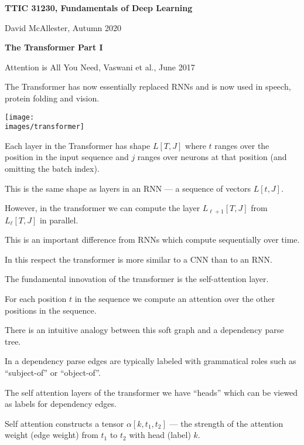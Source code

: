 





{\Huge
  \centerline{\bf TTIC 31230,  Fundamentals of Deep Learning}
  \vfill
  \centerline{David McAllester, Autumn 2020}
  \vfill
  \centerline{\bf  The Transformer Part I}
  \vfill
  \vfill


Attention is All You Need, Vaswani et al., June 2017

\vfill
The Transformer has now essentially replaced RNNs and is now used in speech, protein folding and vision.

\centerline{\texttt{[image: \\images/transformer]}}

\vfill
Each layer in the Transformer has shape $L[T,J]$ where $t$ ranges over the position in the input sequence and $j$ ranges over neurons at that position
(and omitting the batch index).

\vfill
This is the same shape as layers in an RNN --- a sequence of vectors $L[t,J]$.


However, in the transformer we can compute the layer $L_{\ell+1}[T,J]$ from $L_\ell[T,J]$ in parallel.

\vfill
This is an important difference from RNNs which compute sequentially over time.

\vfill
In this respect the transformer is more similar to a CNN than to an RNN.


The fundamental innovation of the transformer is the self-attention layer.

\vfill
For each position $t$ in the sequence we compute an attention over the other positions in the sequence.


There is an intuitive analogy between this soft graph and a dependency parse tree.

\vfill
In a dependency parse edges are typically labeled with grammatical roles such as ``subject-of'' or ``object-of''.

\vfill
The self attention layers of the transformer we have ``heads'' which can be viewed as labels for dependency edges.

\vfill
Self attention constructs a tensor $\alpha[k,t_1,t_2]$ --- the strength of the attention weight (edge weight)
from $t_1$ to $t_2$ with head (label) $k$.

}
